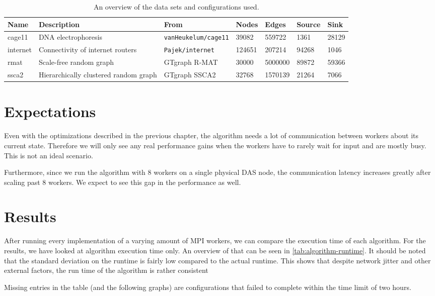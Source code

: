 \begin{table}
	\centering

	\begin{tabularx}{\textwidth}{l | X | l | l | l | l | l}
		Name & Description & From & Nodes & Edges & Source & Sink \\
		\hline
		cage11 & DNA electrophoresis & \texttt{vanHeukelum/cage11} & 39082 & 559722 & 1361 & 28129 \\
		internet & Connectivity of internet routers & \texttt{Pajek/internet} & 124651 & 207214 & 94268 & 1046 \\
		rmat & Scale-free random graph & GTgraph R-MAT & 30000 & 5000000 & 89872 & 59366 \\
		ssca2 & Hierarchically clustered random graph & GTgraph SSCA2 & 32768 & 1570139 & 21264 & 7066 \\
	\end{tabularx}
	\caption{An overview of the data sets and configurations used.}
	\label{tab:data-overview}
\end{table}


\section{Expectations}
Even with the optimizations described in the previous chapter, the algorithm needs a lot of communication between workers about its current state. Therefore we will only see any real performance gains when the workers have to rarely wait for input and are mostly busy. This is not an ideal scenario.

Furthermore, since we run the algorithm with 8 workers on a single physical DAS node, the communication latency increases greatly after scaling past 8 workers. We expect to see this gap in the performance as well.

\section{Results}
After running every implementation of a varying amount of MPI workers, we can compare the execution time of each algorithm. For the results, we have looked at algorithm execution time only. An overview of that can be seen in \autoref{tab:algorithm-runtime}. It should be noted that the standard deviation on the runtime is fairly low compared to the actual runtime. This shows that despite network jitter and other external factors, the run time of the algorithm is rather consistent

Missing entries in the table (and the following graphs) are configurations that failed to complete within the time limit of two hours.

